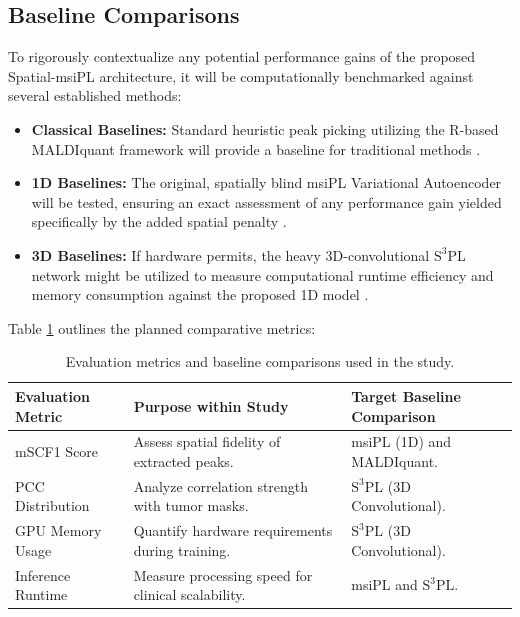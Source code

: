 \documentclass[
12pt, %
oneside, %
english, %
onehalfspacing, %
nolistspacing, %
headsepline, %
]{MastersDoctoralThesis} %
\begin{document}
\subsection{Baseline Comparisons}
To rigorously contextualize any potential performance gains of the proposed Spatial-msiPL architecture, it will be computationally benchmarked against several established methods:
\begin{itemize}
    \item \textbf{Classical Baselines:} Standard heuristic peak picking utilizing the R-based MALDIquant framework will provide a baseline for traditional methods \citep{gibb2012maldiquant}.
    \item \textbf{1D Baselines:} The original, spatially blind msiPL Variational Autoencoder will be tested, ensuring an exact assessment of any performance gain yielded specifically by the added spatial penalty \citep{abdelmoula2021peak}.
    \item \textbf{3D Baselines:} If hardware permits, the heavy 3D-convolutional $\text{S}^{3}\text{PL}$ network might be utilized to measure computational runtime efficiency and memory consumption against the proposed 1D model \citep{weigand2026spatial}.
\end{itemize}

Table \ref{tab:evaluation_metrics} outlines the planned comparative metrics:
\begin{table}[h!]
\centering
\begin{tabular}{|p{4cm}|p{5.5cm}|p{5cm}|}
\hline
\textbf{Evaluation Metric} & \textbf{Purpose within Study} & \textbf{Target Baseline Comparison} \\ \hline

mSCF1 Score &
Assess spatial fidelity of extracted peaks. &
msiPL (1D) and MALDIquant. \\ \hline

PCC Distribution &
Analyze correlation strength with tumor masks. &
$\text{S}^{3}\text{PL}$ (3D Convolutional). \\ \hline

GPU Memory Usage &
Quantify hardware requirements during training. &
$\text{S}^{3}\text{PL}$ (3D Convolutional). \\ \hline

Inference Runtime &
Measure processing speed for clinical scalability. &
msiPL and $\text{S}^{3}\text{PL}$. \\ \hline

\end{tabular}
\caption{Evaluation metrics and baseline comparisons used in the study.}
\label{tab:evaluation_metrics}
\end{table}
\end{document}
